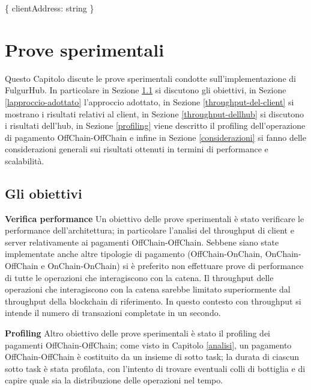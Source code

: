 \documentclass[12pt,italian,]{book}
\newenvironment{Shaded}{}{}
\newcommand{\DataTypeTok}[1]{\textcolor[rgb]{0.56,0.13,0.00}{#1}}
\newcommand{\NormalTok}[1]{#1}
\newcommand{\OperatorTok}[1]{\textcolor[rgb]{0.40,0.40,0.40}{#1}}
\begin{document}
\begin{Shaded}
\begin{Highlighting}[]
\OperatorTok{\{}
  \DataTypeTok{clientAddress}\OperatorTok{:}\NormalTok{ string}
\OperatorTok{\}}
\end{Highlighting}
\end{Shaded}

\hypertarget{prove-sperimentali}{%
\chapter{Prove sperimentali}\label{prove-sperimentali}}

Questo Capitolo discute le prove sperimentali condotte sull'implementazione di FulgurHub. In particolare in Sezione \ref{gli-obiettivi} si discutono gli obiettivi, in Sezione \ref{lapproccio-adottato} l'approccio adottato, in Sezione \ref{throughput-del-client} si mostrano i risultati relativi al client, in Sezione \ref{throughput-dellhub} si discutono i risultati dell'hub, in Sezione \ref{profiling} viene descritto il profiling dell'operazione di pagamento OffChain-OffChain e infine in Sezione \ref{considerazioni} si fanno delle considerazioni generali sui risultati ottenuti in termini di performance e scalabilità.

\hypertarget{gli-obiettivi}{%
\section{Gli obiettivi}\label{gli-obiettivi}}

\textbf{\textbf{Verifica performance}} Un obiettivo delle prove sperimentali è stato verificare le performance dell'architettura; in particolare l'analisi del throughput di client e server relativamente ai pagamenti OffChain-OffChain. Sebbene siano state implementate anche altre tipologie di pagamento (OffChain-OnChain, OnChain-OffChain e OnChain-OnChain) si è preferito non effettuare prove di performance di tutte le operazioni che interagiscono con la catena. Il throughput delle operazioni che interagiscono con la catena sarebbe limitato superiormente dal throughput della blockchain di riferimento. In questo contesto con throughput si intende il numero di transazioni completate in un secondo.

\textbf{\textbf{Profiling}} Altro obiettivo delle prove sperimentali è stato il profiling dei pagamenti OffChain-OffChain; come visto in Capitolo \ref{analisi}, un pagamento OffChain-OffChain è costituito da un insieme di sotto task; la durata di ciascun sotto task è stata profilata, con l'intento di trovare eventuali colli di bottiglia e di capire quale sia la distribuzione delle operazioni nel tempo.
\end{document}

